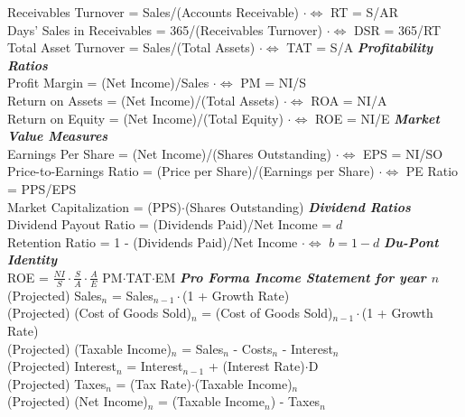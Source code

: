 \documentclass{letter}
\newcommand{\textib}[1]{\textit{\textbf{{#1}}}}
\begin{document}
Receivables Turnover = Sales/(Accounts Receivable) \leaders\hbox{$\cdot$}\hfill $\iff$ RT = S/AR \\
Days' Sales in Receivables = 365/(Receivables Turnover) \leaders\hbox{$\cdot$}\hfill $\iff$ DSR = 365/RT \\
Total Asset Turnover = Sales/(Total Assets) \leaders\hbox{$\cdot$}\hfill $\iff$ TAT = S/A
\newline
\textib{Profitability Ratios} \\
Profit Margin = (Net Income)/Sales \leaders\hbox{$\cdot$}\hfill $\iff$ PM = NI/S \\
Return on Assets = (Net Income)/(Total Assets) \leaders\hbox{$\cdot$}\hfill $\iff$ ROA = NI/A \\
Return on Equity = (Net Income)/(Total Equity) \leaders\hbox{$\cdot$}\hfill $\iff$ ROE = NI/E
\newline
\textib{Market Value Measures} \\
Earnings Per Share = (Net Income)/(Shares Outstanding) \leaders\hbox{$\cdot$}\hfill $\iff$ EPS = NI/SO \\
Price-to-Earnings Ratio = (Price per Share)/(Earnings per Share) \leaders\hbox{$\cdot$}\hfill $\iff$ PE Ratio = PPS/EPS \\
Market Capitalization = (PPS)$\cdot$(Shares Outstanding)
\newline
\textib{Dividend Ratios} \\
Dividend Payout Ratio = (Dividends Paid)/Net Income = $d$ \\
Retention Ratio = 1 - (Dividends Paid)/Net Income \leaders\hbox{$\cdot$}\hfill $\iff$ $b = 1 - d$
\newline
\textib{Du-Pont Identity} \\
ROE = $\frac{NI}{S} \cdot \frac{S}{A} \cdot \frac{A}{E}$ PM$\cdot$TAT$\cdot$EM
\newline
\textib{Pro Forma Income Statement for year $n$} \\
(Projected) Sales$_n$ = Sales$_{n - 1} \cdot$(1 + Growth Rate) \\
(Projected) (Cost of Goods Sold)$_n$ = (Cost of Goods Sold)$_{n - 1} \cdot$(1 + Growth Rate) \\
(Projected) (Taxable Income)$_n$ = Sales$_n$ - Costs$_n$ - Interest$_n$ \\
(Projected) Interest$_n$ = Interest$_{n - 1}$ + (Interest Rate)$\cdot$D \\
(Projected) Taxes$_n$ = (Tax Rate)$\cdot$(Taxable Income)$_n$ \\
(Projected) (Net Income)$_n$ = (Taxable Income$_n$) - Taxes$_n$ \\
\end{document}
